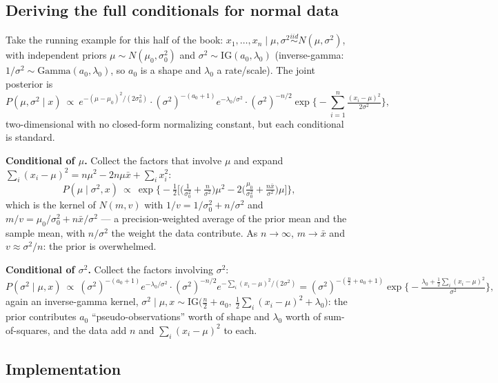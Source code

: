 \documentclass[
  letterpaper,
  DIV=11,
  numbers=noendperiod]{scrreprt}
\begin{document}
\subsection{Deriving the full conditionals for normal
data}\label{deriving-the-full-conditionals-for-normal-data}

Take the running example for this half of the book:
\(x_1, \ldots, x_n \mid \mu, \sigma^2 \overset{iid}{\sim} N(\mu, \sigma^2)\),
with independent priors \(\mu \sim N(\mu_0, \sigma_0^2)\) and
\(\sigma^2 \sim \mathrm{IG}(a_0, \lambda_0)\) (inverse-gamma:
\(1/\sigma^2 \sim \mathrm{Gamma}(a_0, \lambda_0)\), so \(a_0\) is a
shape and \(\lambda_0\) a rate/scale). The joint posterior is \[
P(\mu, \sigma^2 \mid x) \ \propto\ e^{-(\mu-\mu_0)^2 / (2\sigma_0^2)} \cdot (\sigma^2)^{-(a_0+1)} e^{-\lambda_0/\sigma^2} \cdot (\sigma^2)^{-n/2} \exp\Big\{-\sum_{i=1}^n \tfrac{(x_i-\mu)^2}{2\sigma^2}\Big\},
\] two-dimensional with no closed-form normalizing constant, but each
conditional is standard.

\textbf{Conditional of \(\mu\).} Collect the factors that involve
\(\mu\) and expand
\(\sum_i(x_i-\mu)^2 = n\mu^2 - 2n\mu\bar x + \sum_i x_i^2\): \[
P(\mu \mid \sigma^2, x) \ \propto\ \exp\Big\{-\tfrac12\Big[\big(\tfrac{1}{\sigma_0^2} + \tfrac{n}{\sigma^2}\big)\mu^2 - 2\big(\tfrac{\mu_0}{\sigma_0^2} + \tfrac{n\bar x}{\sigma^2}\big)\mu\Big]\Big\},
\] which is the kernel of \(N(m, v)\) with
\(1/v = 1/\sigma_0^2 + n/\sigma^2\) and
\(m/v = \mu_0/\sigma_0^2 + n\bar x/\sigma^2\) --- a precision-weighted
average of the prior mean and the sample mean, with \(n/\sigma^2\) the
weight the data contribute. As \(n \to \infty\), \(m \to \bar x\) and
\(v \approx \sigma^2/n\): the prior is overwhelmed.

\textbf{Conditional of \(\sigma^2\).} Collect the factors involving
\(\sigma^2\): \[
P(\sigma^2 \mid \mu, x) \ \propto\ (\sigma^2)^{-(a_0+1)} e^{-\lambda_0/\sigma^2} \cdot (\sigma^2)^{-n/2} e^{-\sum_i(x_i-\mu)^2/(2\sigma^2)}
= (\sigma^2)^{-\left(\frac n2 + a_0 + 1\right)} \exp\Big\{-\tfrac{\lambda_0 + \frac12\sum_i(x_i-\mu)^2}{\sigma^2}\Big\},
\] again an inverse-gamma kernel,
\(\sigma^2 \mid \mu, x \sim \mathrm{IG}\big(\tfrac n2 + a_0,\ \tfrac12\sum_i(x_i-\mu)^2 + \lambda_0\big)\):
the prior contributes \(a_0\) ``pseudo-observations'' worth of shape and
\(\lambda_0\) worth of sum-of-squares, and the data add \(n\) and
\(\sum_i(x_i-\mu)^2\) to each.

\subsection{Implementation}\label{implementation-3}
\end{document}
